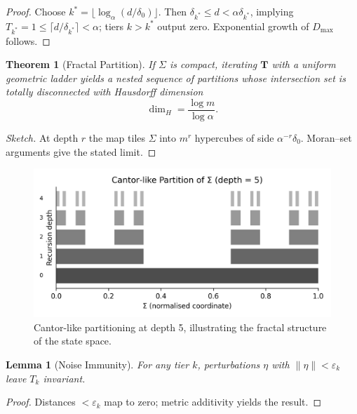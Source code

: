 \documentclass[preprint,11pt]{elsarticle}
\newtheorem{theorem}{Theorem}
\newtheorem{lemma}{Lemma}
\begin{document}
\begin{proof}
Choose
$k^\ast=\bigl\lfloor \log_\alpha (d/\delta_0)\bigr\rfloor$.
Then $\delta_{k^\ast}\le d<\alpha\delta_{k^\ast}$, implying
$T_{k^\ast}=1\le\lceil d/\delta_{k^\ast}\rceil<\alpha$; tiers
$k>k^\ast$ output zero.  Exponential growth of $D_{\max}$ follows.
\end{proof}

\begin{theorem}[Fractal Partition]
If $\Sigma$ is compact, iterating $\mathbf T$ with a uniform geometric
ladder yields a nested sequence of partitions whose intersection set
is totally disconnected with Hausdorff dimension
\[
\dim_H=\frac{\log m}{\log\alpha}.
\]
\end{theorem}

\begin{proof}[Sketch]
At depth $r$ the map tiles $\Sigma$ into $m^r$ hypercubes of side
$\alpha^{-r}\delta_0$.  Moran--set arguments give the stated limit.
\end{proof}

\begin{figure}[ht]
  \centering
  \includegraphics[width=0.9\linewidth]{figures/cantor_partition_depth5.png}
  \caption{Cantor-like partitioning at depth 5, illustrating the fractal structure of the state space.}
  \label{fig:cantor_partition}
\end{figure}

\begin{lemma}[Noise Immunity]
For any tier $k$, perturbations $\eta$ with
$\|\eta\|<\varepsilon_k$ leave $T_k$ invariant.
\end{lemma}

\begin{proof}
Distances $<\varepsilon_k$ map to zero; metric additivity yields the
result.
\end{proof}

\end{document}
